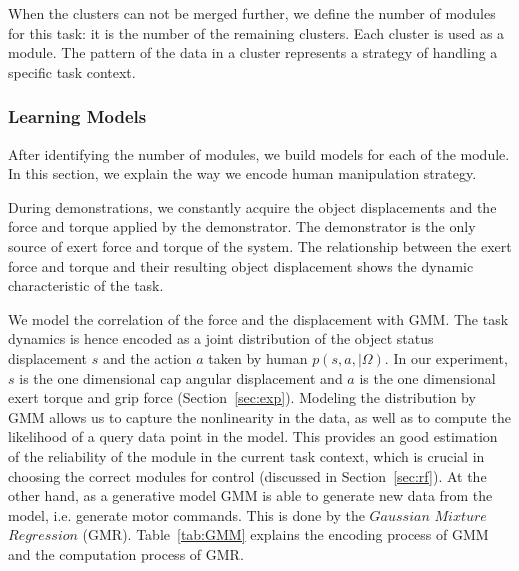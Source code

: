 When the clusters can not be merged further, we define the number of modules for this task: it is the number of the remaining clusters. Each cluster is used as a module. The pattern of the data in a cluster represents a strategy of handling a specific task context.

\subsubsection{Learning Models}
\label{sec:model}
After identifying the number of modules, we build models for each of the module. In this section, we explain the way we encode human manipulation strategy.

During demonstrations, we constantly acquire the object displacements and the force and torque applied by the demonstrator. The demonstrator is the only source of exert force and torque of the system. The relationship between the exert force and torque and their resulting object displacement shows the dynamic characteristic of the task.

We model the correlation of the force and the displacement with GMM. The task dynamics is hence encoded as a joint distribution of the object status displacement $s$ and the action $a$ taken by human $p(s,a,{\mid}{\Omega})$. In our experiment, $s$ is the one dimensional cap angular displacement and $a$ is the one dimensional exert torque and grip force (Section~\ref{sec:exp}).
Modeling the distribution by GMM allows us to capture the nonlinearity in the data, as well as to compute the likelihood of a query data point in the model. This provides an good estimation of the reliability of the module in the current task context, which is crucial in choosing the correct modules for control (discussed in Section~\ref{sec:rf}). At the other hand, as a generative model GMM is able to generate new data from the model, i.e. generate motor commands. This is done by the $Gaussian$ $Mixture$ $Regression$ (GMR). Table~\ref{tab:GMM} explains the encoding process of GMM and the computation process of GMR.




